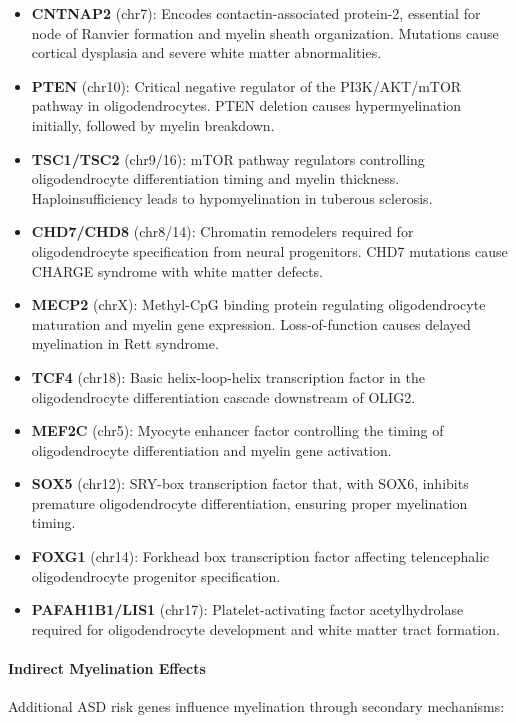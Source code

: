 \documentclass[11pt]{article}
\begin{document}
\begin{itemize}
\item \textbf{CNTNAP2} (chr7): Encodes contactin-associated protein-2, essential for node of Ranvier formation and myelin sheath organization. Mutations cause cortical dysplasia and severe white matter abnormalities.
\item \textbf{PTEN} (chr10): Critical negative regulator of the PI3K/AKT/mTOR pathway in oligodendrocytes. PTEN deletion causes hypermyelination initially, followed by myelin breakdown.
\item \textbf{TSC1/TSC2} (chr9/16): mTOR pathway regulators controlling oligodendrocyte differentiation timing and myelin thickness. Haploinsufficiency leads to hypomyelination in tuberous sclerosis.
\item \textbf{CHD7/CHD8} (chr8/14): Chromatin remodelers required for oligodendrocyte specification from neural progenitors. CHD7 mutations cause CHARGE syndrome with white matter defects.
\item \textbf{MECP2} (chrX): Methyl-CpG binding protein regulating oligodendrocyte maturation and myelin gene expression. Loss-of-function causes delayed myelination in Rett syndrome.
\item \textbf{TCF4} (chr18): Basic helix-loop-helix transcription factor in the oligodendrocyte differentiation cascade downstream of OLIG2.
\item \textbf{MEF2C} (chr5): Myocyte enhancer factor controlling the timing of oligodendrocyte differentiation and myelin gene activation.
\item \textbf{SOX5} (chr12): SRY-box transcription factor that, with SOX6, inhibits premature oligodendrocyte differentiation, ensuring proper myelination timing.
\item \textbf{FOXG1} (chr14): Forkhead box transcription factor affecting telencephalic oligodendrocyte progenitor specification.
\item \textbf{PAFAH1B1/LIS1} (chr17): Platelet-activating factor acetylhydrolase required for oligodendrocyte development and white matter tract formation.
\end{itemize}

\paragraph{Indirect Myelination Effects}
Additional ASD risk genes influence myelination through secondary mechanisms:
\end{document}
